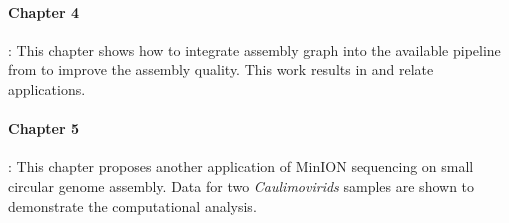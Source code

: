 \paragraph{Chapter 4}: 
This chapter shows how to integrate assembly graph into the available pipeline from \npscarf{} to improve the assembly quality. This work results in \npgraph{} and relate applications.
\paragraph{Chapter 5}: 
This chapter proposes another application of MinION sequencing on small  circular genome assembly. Data for two \emph{Caulimovirids} samples are shown to demonstrate the computational analysis.